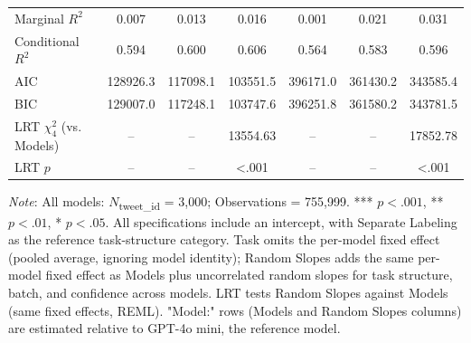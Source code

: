 \documentclass{article}
\begin{document}
\begin{table}
{\begin{tabular}{lcccccc}
Marginal $R^2$ & 0.007 & 0.013 & 0.016 & 0.001 & 0.021 & 0.031 \\
Conditional $R^2$ & 0.594 & 0.600 & 0.606 & 0.564 & 0.583 & 0.596 \\
AIC & 128926.3 & 117098.1 & 103551.5 & 396171.0 & 361430.2 & 343585.4 \\
BIC & 129007.0 & 117248.1 & 103747.6 & 396251.8 & 361580.2 & 343781.5 \\
LRT $\chi^2_{4}$ (vs. Models) & -- & -- & 13554.63 & -- & -- & 17852.78 \\
LRT $p$ & -- & -- & <.001 & -- & -- & <.001 \\
\bottomrule
\end{tabular}%
}
\smallskip
\footnotesize \textit{Note}: All models: $N$\textsubscript{tweet\_id} = 3,000; Observations = 755,999. *** $p<.001$, ** $p<.01$, * $p<.05$. All specifications include an intercept, with Separate Labeling as the reference task-structure category. Task omits the per-model fixed effect (pooled average, ignoring model identity); Random Slopes adds the same per-model fixed effect as Models plus uncorrelated random slopes for task structure, batch, and confidence across models. LRT tests Random Slopes against Models (same fixed effects, REML).
\footnotesize "Model:" rows (Models and Random Slopes columns) are estimated relative to GPT-4o mini, the reference model.
\end{table}
\end{document}
